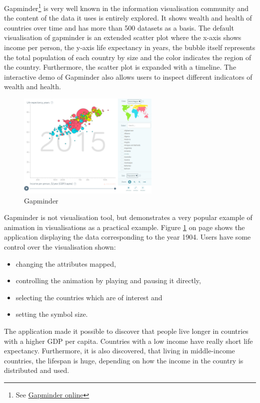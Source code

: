 Gapminder\footnote{See \href{https://www.gapminder.org/}{Gapminder online}} is very well known in the information visualisation community and the content of the data it uses is entirely explored. It shows wealth and health of countries over time and has more than 500 datasets as a basis. The default visualisation of gapminder is an extended scatter plot where the x-axis shows income per person, the y-axis life expectancy in years, the bubble itself represents the total population of each country by size and the color indicates the region of the country. Furthermore, the scatter plot is expanded with a timeline. The interactive demo of Gapminder also allows users to inspect different indicators of wealth and health.

\begin{figure}[!htb]
\centering
\includegraphics[height=5cm]{images/methods/related/gapminder.png}
\caption[
    Gapminder
]{Gapminder}
\label{fig:gapminder}
\end{figure}

Gapminder is not visualisation tool, but demonstrates a very popular example of animation in visualisations as a practical example. Figure \ref{fig:gapminder} on page \pageref{fig:gapminder} shows the application displaying the data corresponding to the year 1904. Users have some control over the visualisation shown:
\begin{itemize}
\item changing the attributes mapped,
\item controlling the animation by playing and pausing it directly,
\item selecting the countries which are of interest and
\item setting the symbol size.
\end{itemize}

The application made it possible to discover that people live longer in countries with a higher \ac{GDP} per capita. Countries with a low income have really short life expectancy. Furthermore, it is also discovered, that living in middle-income countries, the lifespan is huge, depending on how the income in the country is distributed and used.
